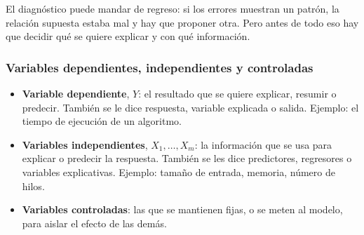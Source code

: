 \documentclass[11pt,letterpaper]{article}
\begin{document}
\begin{center}
\end{center}

El diagnóstico puede mandar de regreso: si los errores muestran un
patrón, la relación supuesta estaba mal y hay que proponer otra. Pero
antes de todo eso hay que decidir qué se quiere explicar y con qué
información.

\subsubsection*{Variables dependientes, independientes y controladas}

\begin{itemize}[itemsep=0.3em]
    \item \textbf{Variable dependiente}, $Y$: el resultado que se quiere
          explicar, resumir o predecir. También se le dice respuesta,
          variable explicada o salida. Ejemplo: el tiempo de ejecución
          de un algoritmo.
    \item \textbf{Variables independientes}, $X_1, \ldots, X_m$: la
          información que se usa para explicar o predecir la respuesta.
          También se les dice predictores, regresores o variables
          explicativas. Ejemplo: tamaño de entrada, memoria, número de
          hilos.
    \item \textbf{Variables controladas}: las que se mantienen fijas, o
          se meten al modelo, para aislar el efecto de las demás.
\end{itemize}
\end{document}
